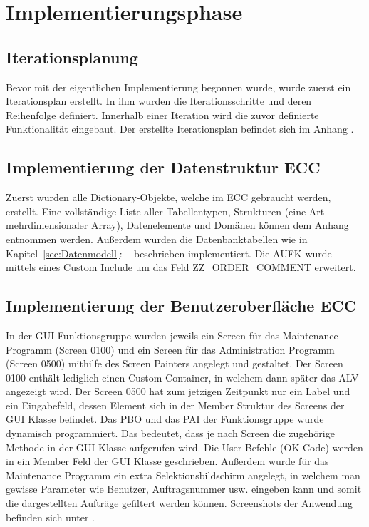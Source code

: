 \section{Implementierungsphase} 
\label{sec:Implementierungsphase}

\subsection{Iterationsplanung}
\label{sec:Iterationsplanung}
Bevor mit der eigentlichen Implementierung begonnen wurde, wurde zuerst ein Iterationsplan erstellt. In ihm wurden die Iterationsschritte und deren Reihenfolge definiert. Innerhalb einer Iteration wird die zuvor definierte Funktionalität eingebaut. Der erstellte Iterationsplan befindet sich im Anhang .

\subsection{Implementierung der Datenstruktur ECC}
\label{sec:Implementierung der Datenstruktur ECC}
Zuerst wurden alle Dictionary-Objekte, welche im \ac{ECC} gebraucht werden, erstellt. Eine vollständige Liste aller Tabellentypen, Strukturen (eine Art mehrdimensionaler Array), Datenelemente und Domänen können dem Anhang entnommen werden. Außerdem wurden die Datenbanktabellen wie in Kapitel~\ref{sec:Datenmodell}: ~ beschrieben implementiert. Die AUFK wurde mittels eines Custom Include um das Feld ZZ\_ORDER\_COMMENT erweitert.

\subsection{Implementierung der Benutzeroberfläche ECC}
\label{sec:Implementierung der Benutzeroberfläche ECC}
In der \ac{GUI} Funktionsgruppe wurden jeweils ein Screen für das Maintenance Programm (Screen 0100) und ein Screen für das Administration Programm (Screen 0500) mithilfe des Screen Painters angelegt und gestaltet. Der Screen 0100 enthält lediglich einen Custom Container, in welchem dann später das \ac{ALV} angezeigt wird. Der Screen 0500 hat zum jetzigen Zeitpunkt nur ein Label und ein Eingabefeld, dessen Element sich in der Member Struktur des Screens der \ac{GUI} Klasse befindet. Das \ac{PBO} und das \ac{PAI} der Funktionsgruppe wurde dynamisch programmiert. Das bedeutet, dass je nach Screen die zugehörige Methode in der \ac{GUI} Klasse aufgerufen wird. Die User Befehle (OK Code) werden in ein Member Feld der \ac{GUI} Klasse geschrieben. Außerdem wurde für das Maintenance Programm ein extra Selektionsbildschirm angelegt, in welchem man gewisse Parameter wie Benutzer, Auftragsnummer usw. eingeben kann und somit die dargestellten Aufträge gefiltert werden können. Screenshots der Anwendung befinden sich unter .

